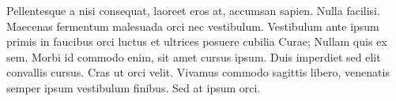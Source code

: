 
Pellentesque a nisi consequat, laoreet eros at, accumsan sapien. Nulla facilisi. Maecenas fermentum malesuada orci nec vestibulum. Vestibulum ante ipsum primis in faucibus orci luctus et ultrices posuere cubilia Curae; Nullam quis ex sem. Morbi id commodo enim, sit amet cursus ipsum. Duis imperdiet sed elit convallis cursus. Cras ut orci velit. Vivamus commodo sagittis libero, venenatis semper ipsum vestibulum finibus. Sed at ipsum orci.